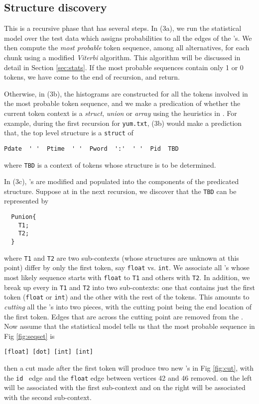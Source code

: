 \subsection{Structure discovery}
This is a recursive phase that has several steps.
In (3a), we run the statistical model over the test data
which assigns probabilities to all the edges of the \seqset's.
We then compute the {\em most probable} token sequence, among all alternatives,
for each chunk using a modified {\em Viterbi} algorithm. This algorithm
will be discussed in detail in Section \ref{sec:stats}.
If the most probable sequences contain only 1 or 0 tokens, we have come to
the end of recursion, and return.

Otherwise, in (3b), the histograms are constructed for
all the tokens involved in the most probable token sequence, and we
make a predication of whether the current token context is a {\em struct},
{\em union} or {\em array} using the heuristics in \cite{fisher+:dirttoshovels}. 
For example, during the first recursion for {\tt yum.txt}, 
(3b) would make a prediction that, the top level structure is
a {\tt struct} of

{\small 
\begin{verbatim}
Pdate  ' '  Ptime  ' '  Pword  ':'  ' '  Pid  TBD
\end{verbatim}
}
\noindent
where {\tt TBD} is a context of tokens whose structure is to be determined.

In (3c), \seqset's are modified and populated into the components of
the predicated structure. Suppose at in the next recursion, 
we discover that the {\tt TBD} can be represented by
{\small
\begin{verbatim}
  Punion{
    T1;
    T2;
  }
\end{verbatim}
}
\noindent 
where {\tt T1} and {\tt T2} are two sub-contexts (whose structures are unknown at this
point) differ by only the first token, 
say {\tt float} vs. {\tt int}. We associate all 
\seqset's whose most likely sequence starts with {\tt float} to {\tt T1} and others with
{\tt T2}. In addition, we break up every \seqset{} in {\tt T1} and {\tt T2} into two sub-contexts:
one that contains just the first token ({\tt float} or {\tt int}) and the other with the rest 
of the tokens.  This amounts to {\em cutting} all the \seqset's into two pieces, 
with the cutting point being the end location of the first token. Edges that are across
the cutting point are removed from the \seqset. Now assume that the statistical
model tells us that the most probable sequence in Fig \ref{fig:seqset} is 
{\small
\begin{verbatim}
[float] [dot] [int] [int]
\end{verbatim}
}
\noindent
then a cut made after the first token will produce two new \seqset's in
Fig \ref{fig:cut}, with the {\tt id}~ edge and the {\tt float} edge between
vertices 42 and 46 removed. \seqset{} on the left will be associated with
the first sub-context and \seqset{} on the right will be associated with the
second sub-context.

